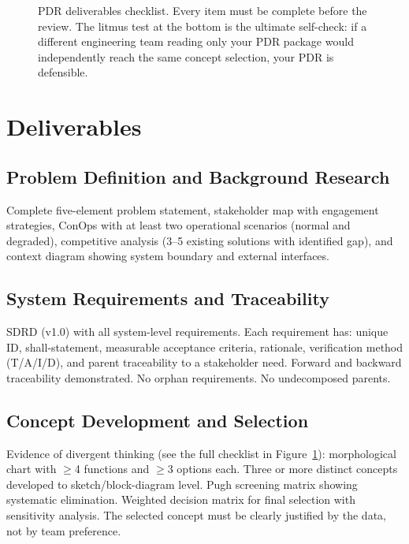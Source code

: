 \documentclass[11pt,letterpaper,twoside,openany]{book}
\begin{document}
\begin{figure}[htbp]
\caption{PDR deliverables checklist. Every item must be complete before the review. The litmus test at the bottom is the ultimate self-check: if a different engineering team reading only your PDR package would independently reach the same concept selection, your PDR is defensible.}\label{fig:pdr_checklist}
\end{figure}

\section{Deliverables}

\subsection{Problem Definition and Background Research}
Complete five-element problem statement, stakeholder map with engagement strategies, ConOps with at least two operational scenarios (normal and degraded), competitive analysis (3--5 existing solutions with identified gap), and context diagram showing system boundary and external interfaces.

\subsection{System Requirements and Traceability}
SDRD (v1.0) with all system-level requirements. Each requirement has: unique ID, shall-statement, measurable acceptance criteria, rationale, verification method (T/A/I/D), and parent traceability to a stakeholder need. Forward and backward traceability demonstrated. No orphan requirements. No undecomposed parents.

\subsection{Concept Development and Selection}
Evidence of divergent thinking (see the full checklist in Figure~\ref{fig:pdr_checklist}): morphological chart with $\geq$4 functions and $\geq$3 options each. Three or more distinct concepts developed to sketch/block-diagram level. Pugh screening matrix showing systematic elimination. Weighted decision matrix for final selection with sensitivity analysis. The selected concept must be clearly justified by the data, not by team preference.
\end{document}
